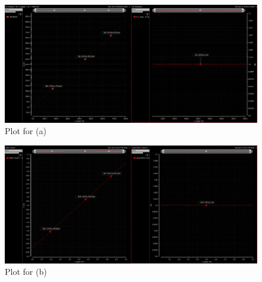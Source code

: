 \documentclass[a4paper]{article}
\begin{document}
\begin{figure}
    \centering
    \includegraphics[width=1\linewidth]{images/Lec_1_Q_1_a_plot.png}
    \caption{Plot for (a)}
\end{figure}

\begin{figure}
    \centering
    \includegraphics[width=1\linewidth]{images/Lec_1_Q_1_b_plot.png}
    \caption{Plot for (b)}
\end{figure}
\end{document}
